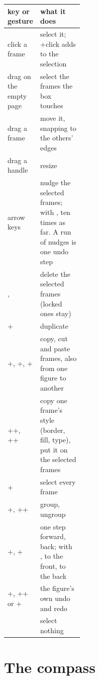 \begin{center}\small
\begin{tabularx}{\linewidth}{@{}>{\raggedright}p{0.3\linewidth}L@{}}\toprule
\sffamily\bfseries key or gesture & \sffamily\bfseries what it does \\\midrule
click a frame & select it; +click adds to the selection \\
drag on the empty page & select the frames the box touches \\
drag a frame & move it, snapping to the others' edges \\
drag a handle & resize \\
arrow keys & nudge the selected frames; with , ten times as far. A run of nudges is one undo step \\
,  & delete the selected frames (locked ones stay) \\
+ & duplicate \\
+, +, + & copy, cut and paste frames, also from one figure to another \\
++, ++ & copy one frame's style (border, fill, type), put it on the selected frames \\
+ & select every frame \\
+, ++ & group, ungroup \\
+\key{]}, +\key{[} & one step forward, back; with , to the front, to the back \\
+, ++ or + & the figure's own undo and redo \\
 & select nothing \\
\bottomrule\end{tabularx}
\end{center}

\section{The compass}

